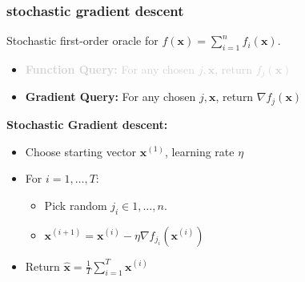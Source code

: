 \documentclass[compress]{beamer}
\newcommand{\bv}[1]{\mathbf{#1}}
\begin{document}
\begin{frame}[t]
	\frametitle{stochastic gradient descent}
   {Stochastic first-order oracle} for $f(\bv{x}) = \sum_{i=1}^n f_i(\bv{x})$. 
	\begin{itemize}
		\item \textcolor{lightgray}{ \textbf{Function Query:} For any chosen $j, \bv{x}$, return $f_j(\bv{x})$}
		\item \textbf{Gradient Query:} For any chosen $j, \bv{x}$, return $\nabla f_j(\bv{x})$
	\end{itemize}

	\textbf{Stochastic Gradient descent:}
	\begin{itemize}
		\item Choose starting vector $\bv{x}^{(1)}$, learning rate $\eta$
		\item For $i = 1,\ldots, T$:
		\begin{itemize}
			\item Pick random $j_i \in 1, \ldots, n$.
			\item $\bv{x}^{(i+1)} = \bv{x}^{(i)} - \eta \nabla f_{j_i}(\bv{x}^{(i)})$
		\end{itemize}
		\item Return $\hat{\bv{x}} = \frac{1}{T}\sum_{i=1}^T \bv{x}^{(i)}$
	\end{itemize}
\end{frame}
\end{document}
